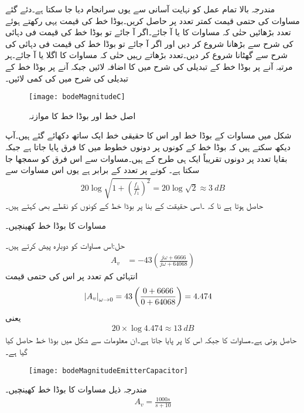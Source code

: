 مندرجہ بالا تمام عمل کو نہایت آسانی سے یوں سرانجام دیا جا سکتا ہے۔دئے گئے مساوات کی حتمی قیمت کمتر تعدد پر  حاصل کریں۔بوڈا خط کی قیمت یہی رکھتے ہوئے تعدد بڑھائیں حتٰی کہ مساوات کا  یا  آ جائے۔اگر  آ جائے تو بوڈا خط کی قیمت  فی دہائی کی شرح سے بڑھانا شروع کر دیں اور اگر  آ جائے تو بوڈا خط کی قیمت  فی دہائی کی شرح سے گھٹانا شروع کر دیں۔تعدد بڑھاتے رہیں حتٰی کہ مساوات کا اگلا  یا  آ جائے۔ہر مرتبہ  آنے پر بوڈا خط کے تبدیلی کی شرح میں  کا اضافہ لائیں جبکہ  آنے پر بوڈا خط کے تبدیلی کی شرح میں  کی کمی لائیں۔
\begin{figure}
\centering
\texttt{[image: bodeMagnitudeC]}
\caption{اصل خط اور بوڈا خط کا موازنہ}
\label{شکل_تعددی_ردعمل_بوڈا_اصل_موازنہ}
\end{figure}

شکل  میں مساوات  کے بوڈا خط اور اس کا حقیقی خط ایک ساتھ دکھائے گئے ہیں۔آپ دیکھ سکتے ہیں کہ بوڈا خط کے کونوں پر دونوں خطوط میں  کا فرق پایا جاتا ہے جبکہ بقایا تعدد پر دونوں تقریباً ایک ہی طرح کے ہیں۔مساوات  سے اس فرق کو سمجھا جا سکتا ہے۔ کونے پر تعدد  کے برابر ہے یوں اس مساوات سے
\begin{align*}
20 \log \sqrt{1+\left(\frac{f_1}{f_1}\right)^2} = 20 \log \sqrt{2} \approx \SI{3}{dB}
\end{align*}
حاصل ہوتا ہے نا کہ ۔اسی حقیقت کے بنا پر بوڈا خط کے کونوں کو  نقطے  بھی کہتے ہیں۔
 
مساوات  کا بوڈا خط کھینچیں۔

حل:اس مساوات کو دوبارہ پیش کرتے ہیں۔
\begin{align*}
A_v&=-43 \left(\frac{j \omega+6666}{j \omega+64068} \right)
\end{align*}
انتہائی کم تعدد  پر اس کی حتمی قیمت
\begin{align*}
\abs{A_v}_{\omega \to 0}&=43 \left(\frac{0+6666}{0+64068} \right)=4.474
\end{align*}
یعنی
\begin{align*}
20 \times \log 4.474 \approx \SI{13}{dB}
\end{align*}
حاصل ہوتی ہے۔مساوات کا   جبکہ اس کا   پر پایا جاتا ہے۔ان معلومات سے شکل  میں بوڈا خط حاصل کیا گیا ہے۔
\begin{figure}
\centering
\texttt{[image: bodeMagnitudeEmitterCapacitor]}
\caption{}
\label{شکل_تعددی_ردعمل_بوڈا_مخارج_کپیسٹر}
\end{figure}
مندرجہ ذیل مساوات کا بوڈا خط کھینچیں۔
\begin{align*}
A_v=\frac{1000 s}{s+10}
\end{align*}

